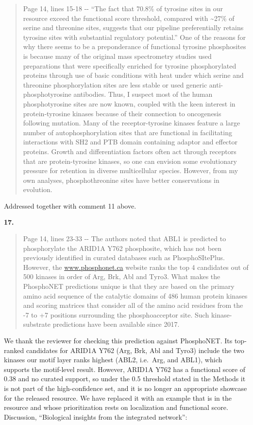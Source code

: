 \documentclass[
]{article}
\begin{document}
\begin{quote}
Page 14, lines 15-18 -\/- ``The fact that 70.8\% of tyrosine sites in
our resource exceed the functional score threshold, compared with
\textasciitilde27\% of serine and threonine sites, suggests that our
pipeline preferentially retains tyrosine sites with substantial
regulatory potential.'' One of the reasons for why there seems to be a
preponderance of functional tyrosine phosphosites is because many of the
original mass spectrometry studies used preparations that were
specifically enriched for tyrosine phosphorylated proteins through use
of basic conditions with heat under which serine and threonine
phosphorylation sites are less stable or used generic
anti-phosphotyrosine antibodies. Thus, I suspect most of the human
phosphotyrosine sites are now known, coupled with the keen interest in
protein-tyrosine kinases because of their connection to oncogenesis
following mutation. Many of the receptor-tyrosine kinases feature a
large number of autophosphorylation sites that are functional in
facilitating interactions with SH2 and PTB domain containing adaptor and
effector proteins. Growth and differentiation factors often act through
receptors that are protein-tyrosine kinases, so one can envision some
evolutionary pressure for retention in diverse multicellular species.
However, from my own analyses, phosphothreonine sites have better
conservations in evolution.
\end{quote}

Addressed together with comment 11 above.

\textbf{17.}

\begin{quote}
Page 14, lines 23-33 -\/- The authors noted that ABL1 is predicted to
phosphorylate the ARID1A Y762 phosphosite, which has not been previously
identified in curated databases such as PhosphoSItePlus. However, the
\href{http://www.phosphonet.ca}{www.phosphonet.ca} website ranks the top
4 candidates out of 500 kinases in order of Arg, Brk, Abl and Tyro3.
What makes the PhosphoNET predictions unique is that they are based on
the primary amino acid sequence of the catalytic domains of 486 human
protein kinases and scoring matrices that consider all of the amino acid
residues from the -7 to +7 positions surrounding the phosphoacceptor
site. Such kinase-substrate predictions have been available since 2017.
\end{quote}

We thank the reviewer for checking this prediction against PhosphoNET.
Its top-ranked candidates for ARID1A Y762 (Arg, Brk, Abl and Tyro3)
include the two kinases our motif layer ranks highest (ABL2, i.e.~Arg,
and ABL1), which supports the motif-level result. However, ARID1A Y762
has a functional score of 0.38 and no curated support, so under the 0.5
threshold stated in the Methods it is not part of the high-confidence
set, and it is no longer an appropriate showcase for the released
resource. We have replaced it with an example that is in the resource
and whose prioritization rests on localization and functional score.
Discussion, ``Biological insights from the integrated network'':
\end{document}
